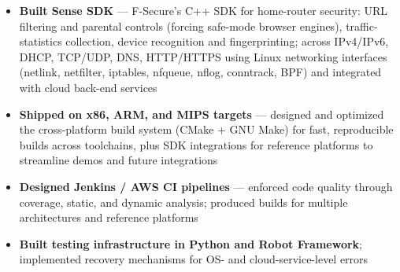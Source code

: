 \documentclass[11pt,a4paper,sans]{moderncv}
\begin{document}
\begin{itemize}[leftmargin=0.6cm, label={\textbullet}]
    \item \textbf{Built Sense SDK} --- F-Secure's C++ SDK for home-router security: URL filtering and parental controls (forcing safe-mode browser engines), traffic-statistics collection, device recognition and fingerprinting; across IPv4/IPv6, DHCP, TCP/UDP, DNS, HTTP/HTTPS using Linux networking interfaces (netlink, netfilter, iptables, nfqueue, nflog, conntrack, BPF) and integrated with cloud back-end services
    \item \textbf{Shipped on x86, ARM, and MIPS targets} --- designed and optimized the cross-platform build system (CMake + GNU Make) for fast, reproducible builds across toolchains, plus SDK integrations for reference platforms to streamline demos and future integrations
    \item \textbf{Designed Jenkins / AWS CI pipelines} --- enforced code quality through coverage, static, and dynamic analysis; produced builds for multiple architectures and reference platforms
    \item \textbf{Built testing infrastructure in Python and Robot Framework}; implemented recovery mechanisms for OS- and cloud-service-level errors
\end{itemize}
\end{document}
